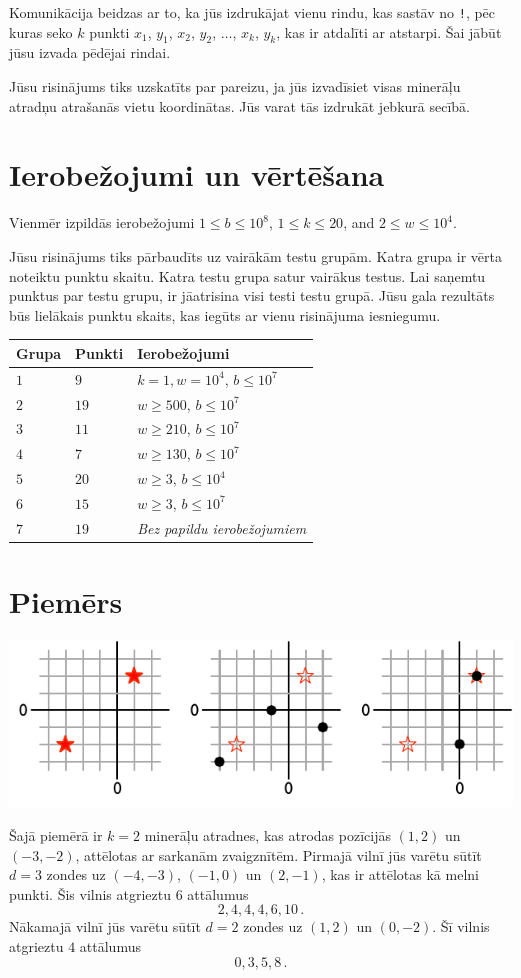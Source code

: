 Komunikācija beidzas ar to, ka jūs izdrukājat vienu rindu, kas sastāv no \texttt{!}, pēc kuras seko $k$ punkti $x_1$, $y_1$, $x_2$, $y_2$, $\ldots$, $x_k$, $y_k$, kas ir atdalīti ar atstarpi.
Šai jābūt jūsu izvada pēdējai rindai.

Jūsu risinājums tiks uzskatīts par pareizu, ja jūs izvadīsiet visas minerāļu atradņu atrašanās vietu koordinātas.
Jūs varat tās izdrukāt jebkurā secībā.

\section*{Ierobežojumi un vērtēšana}

Vienmēr izpildās ierobežojumi
$1\leq b \leq 10^8$, %
$1 \leq k \leq 20$, %
and
$2 \le w \le 10^4$. %

Jūsu risinājums tiks pārbaudīts uz vairākām testu grupām. Katra grupa ir vērta noteiktu punktu skaitu.
Katra testu grupa satur vairākus testus.
Lai saņemtu punktus par testu grupu, ir jāatrisina visi testi testu grupā.
Jūsu gala rezultāts būs lielākais punktu skaits, kas iegūts ar vienu risinājuma iesniegumu.

\medskip
\begin{tabular}{lll}
Grupa & Punkti & Ierobežojumi \\\hline
  $1$ & $9$ & $k = 1, w = 10^4$, $b \le 10^7$\\
  $2$ & $19$ & $w \ge 500$, $b \le 10^7$\\
  $3$ & $11$ & $w \ge 210$, $b \le 10^7$\\
  $4$ & $7$ & $w \ge 130$, $b \le 10^7$\\
  $5$ & $20$ & $w \ge 3$, $b \le 10^4$\\
  $6$ & $15$ & $w \ge 3$, $b \le 10^7$\\
  $7$ & $19$ & \emph{Bez papildu ierobežojumiem}
\end{tabular}

\section*{Piemērs}

\includegraphics[width=.6\textwidth]{img/sample1.pdf}

Šajā piemērā ir $k=2$ minerāļu atradnes, kas atrodas pozīcijās $(1,2)$ un $(-3,-2)$, attēlotas ar sarkanām zvaigznītēm.
Pirmajā vilnī jūs varētu sūtīt $d=3$ zondes uz $(-4,-3)$, $(-1, 0)$ un $(2,-1)$, kas ir attēlotas kā melni punkti.
Šis vilnis atgrieztu $6$ attālumus \[
  2, 4, 4, 4, 6, 10\,.
\]
Nākamajā vilnī jūs varētu sūtīt $d=2$ zondes uz $(1,2)$ un $(0,-2)$.
Šī vilnis atgrieztu $4$ attālumus \[
  0, 3, 5, 8\,.
\]
